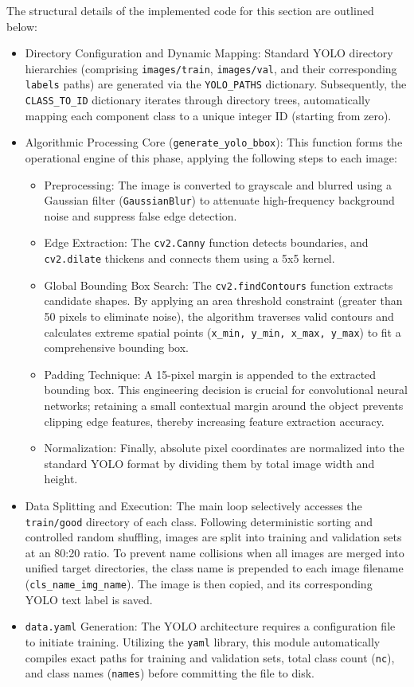 \documentclass{article}
\begin{document}
The structural details of the implemented code for this section are outlined below:

\begin{itemize}
	
	\item Directory Configuration and Dynamic Mapping: Standard YOLO directory hierarchies (comprising \texttt{images/train}, \texttt{images/val}, and their corresponding \texttt{labels} paths) are generated via the \texttt{YOLO\_PATHS} dictionary. Subsequently, the \texttt{CLASS\_TO\_ID} dictionary iterates through directory trees, automatically mapping each component class to a unique integer ID (starting from zero).
	\item Algorithmic Processing Core (\texttt{generate\_yolo\_bbox}): This function forms the operational engine of this phase, applying the following steps to each image:
	\begin{itemize}
		\item Preprocessing: The image is converted to grayscale and blurred using a Gaussian filter (\texttt{GaussianBlur}) to attenuate high-frequency background noise and suppress false edge detection.
		\item Edge Extraction: The \texttt{cv2.Canny} function detects boundaries, and \texttt{cv2.dilate} thickens and connects them using a 5x5 kernel.
		\item Global Bounding Box Search: The \texttt{cv2.findContours} function extracts candidate shapes. By applying an area threshold constraint (greater than 50 pixels to eliminate noise), the algorithm traverses valid contours and calculates extreme spatial points (\texttt{x\_min, y\_min, x\_max, y\_max}) to fit a comprehensive bounding box.
		\item Padding Technique: A 15-pixel margin is appended to the extracted bounding box. This engineering decision is crucial for convolutional neural networks; retaining a small contextual margin around the object prevents clipping edge features, thereby increasing feature extraction accuracy.
		\item Normalization: Finally, absolute pixel coordinates are normalized into the standard YOLO format by dividing them by total image width and height.
	\end{itemize}
	\item Data Splitting and Execution: The main loop selectively accesses the \texttt{train/good} directory of each class. Following deterministic sorting and controlled random shuffling, images are split into training and validation sets at an 80:20 ratio. To prevent name collisions when all images are merged into unified target directories, the class name is prepended to each image filename (\texttt{cls\_name\_img\_name}). The image is then copied, and its corresponding YOLO text label is saved.
	\item \texttt{data.yaml} Generation: The YOLO architecture requires a configuration file to initiate training. Utilizing the \texttt{yaml} library, this module automatically compiles exact paths for training and validation sets, total class count (\texttt{nc}), and class names (\texttt{names}) before committing the file to disk.
\end{itemize}
\end{document}
